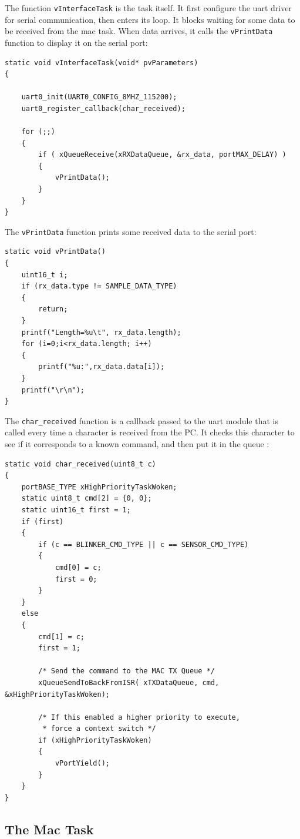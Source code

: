 \documentclass[11pt]{report}
\begin{document}
The function \verb$vInterfaceTask$ is the task itself. It first configure the uart driver for serial communication, then enters its loop. It blocks waiting for some data to be received from the mac task. When data arrives, it calls the \verb$vPrintData$ function to display it on the serial port:

\begin{verbatim}
static void vInterfaceTask(void* pvParameters)
{

    uart0_init(UART0_CONFIG_8MHZ_115200);
    uart0_register_callback(char_received);

    for (;;)
    {
        if ( xQueueReceive(xRXDataQueue, &rx_data, portMAX_DELAY) )
        {
            vPrintData();
        }
    }
}
\end{verbatim}
The \verb$vPrintData$ function prints some received data to the serial port:
\begin{verbatim}
static void vPrintData()
{
    uint16_t i;
    if (rx_data.type != SAMPLE_DATA_TYPE)
    {
        return;
    }
    printf("Length=%u\t", rx_data.length);
    for (i=0;i<rx_data.length; i++)
    {
        printf("%u:",rx_data.data[i]);
    }
    printf("\r\n");
}
\end{verbatim}


The \verb$char_received$ function is a callback passed to the uart module that is called every time a character is received from the PC. It checks this character to see if it corresponds to a known command, and then put it in the queue :
\begin{verbatim}
static void char_received(uint8_t c)
{
    portBASE_TYPE xHighPriorityTaskWoken;
    static uint8_t cmd[2] = {0, 0};
    static uint16_t first = 1;
    if (first)
    {
        if (c == BLINKER_CMD_TYPE || c == SENSOR_CMD_TYPE)
        {
            cmd[0] = c;
            first = 0;
        }
    }
    else
    {
        cmd[1] = c;
        first = 1;

        /* Send the command to the MAC TX Queue */
        xQueueSendToBackFromISR( xTXDataQueue, cmd, &xHighPriorityTaskWoken);

        /* If this enabled a higher priority to execute,
         * force a context switch */
        if (xHighPriorityTaskWoken)
        {
            vPortYield();
        }
    }
}
\end{verbatim}

\subsection{The Mac Task}
\end{document}
